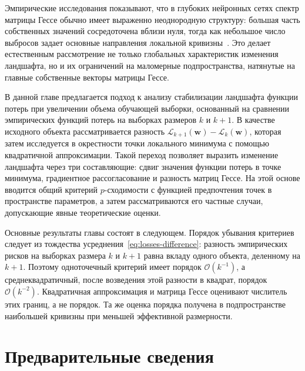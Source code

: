 Эмпирические исследования показывают, что в глубоких нейронных сетях спектр матрицы Гессе обычно имеет выраженно неоднородную структуру: большая часть собственных значений сосредоточена вблизи нуля, тогда как небольшое число выбросов задает основные направления локальной кривизны~\cite{sagun2017hessian,ghorbani2019investigation,papyan2019,papyan2020traces,singh2021analytic}. Это делает естественным рассмотрение не только глобальных характеристик изменения ландшафта, но и их ограничений на маломерные подпространства, натянутые на главные собственные векторы матрицы Гессе.

В данной главе предлагается подход к анализу стабилизации ландшафта функции потерь при увеличении объема обучающей выборки, основанный на сравнении эмпирических функций потерь на выборках размеров $k$ и $k+1$. В качестве исходного объекта рассматривается разность $\mathcal L_{k+1}(\mathbf w)-\mathcal L_k(\mathbf w)$, которая затем исследуется в окрестности точки локального минимума с помощью квадратичной аппроксимации. Такой переход позволяет выразить изменение ландшафта через три составляющие: сдвиг значения функции потерь в точке минимума, градиентное рассогласование и разность матриц Гессе. На этой основе вводится общий критерий $p$-сходимости с функцией предпочтения точек в пространстве параметров, а затем рассматриваются его частные случаи, допускающие явные теоретические оценки.

Основные результаты главы состоят в следующем. Порядок убывания критериев следует из тождества усреднения~\eqref{eq:losses-difference}: разность эмпирических рисков на выборках размера $k$ и $k+1$ равна вкладу одного объекта, деленному на $k+1$. Поэтому одноточечный критерий имеет порядок $\mathcal O(k^{-1})$, а среднеквадратичный, после возведения этой разности в квадрат, порядок $\mathcal O(k^{-2})$. Квадратичная аппроксимация и матрица Гессе оценивают числитель этих границ, а не порядок. Та же оценка порядка получена в подпространстве наибольшей кривизны при меньшей эффективной размерности.

\section{Предварительные сведения}

